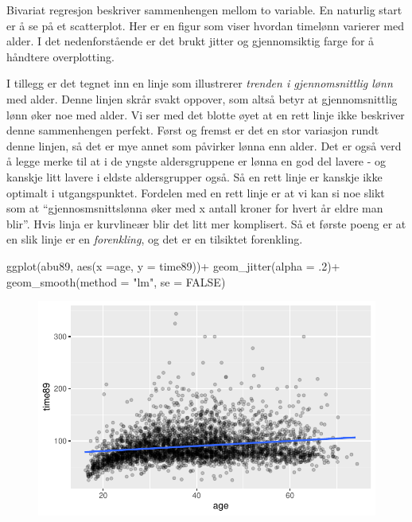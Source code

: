 \documentclass[
  letterpaper,
  DIV=11,
  numbers=noendperiod]{scrreprt}
\newenvironment{Shaded}{\begin{snugshade}}{\end{snugshade}}
\newcommand{\AttributeTok}[1]{\textcolor[rgb]{0.40,0.45,0.13}{#1}}
\newcommand{\ConstantTok}[1]{\textcolor[rgb]{0.56,0.35,0.01}{#1}}
\newcommand{\DecValTok}[1]{\textcolor[rgb]{0.68,0.00,0.00}{#1}}
\newcommand{\FunctionTok}[1]{\textcolor[rgb]{0.28,0.35,0.67}{#1}}
\newcommand{\NormalTok}[1]{\textcolor[rgb]{0.00,0.23,0.31}{#1}}
\newcommand{\SpecialCharTok}[1]{\textcolor[rgb]{0.37,0.37,0.37}{#1}}
\newcommand{\StringTok}[1]{\textcolor[rgb]{0.13,0.47,0.30}{#1}}
\theoremstyle{definition}
\theoremstyle{remark}
\begin{document}
Bivariat regresjon beskriver sammenhengen mellom to variable. En
naturlig start er å se på et scatterplot. Her er en figur som viser
hvordan timelønn varierer med alder. I det nedenforstående er det brukt
jitter og gjennomsiktig farge for å håndtere overplotting.

I tillegg er det tegnet inn en linje som illustrerer \emph{trenden i
gjennomsnittlig lønn} med alder. Denne linjen skrår svakt oppover, som
altså betyr at gjennomsnittlig lønn øker noe med alder. Vi ser med det
blotte øyet at en rett linje ikke beskriver denne sammenhengen perfekt.
Først og fremst er det en stor variasjon rundt denne linjen, så det er
mye annet som påvirker lønna enn alder. Det er også verd å legge merke
til at i de yngste aldersgruppene er lønna en god del lavere - og
kanskje litt lavere i eldste aldersgrupper også. Så en rett linje er
kanskje ikke optimalt i utgangspunktet. Fordelen med en rett linje er at
vi kan si noe slikt som at ``gjennosmsnittslønna øker med x antall
kroner for hvert år eldre man blir''. Hvis linja er kurvlineær blir det
litt mer komplisert. Så et første poeng er at en slik linje er en
\emph{forenkling}, og det er en tilsiktet forenkling.

\begin{Shaded}
\begin{Highlighting}[]
\FunctionTok{ggplot}\NormalTok{(abu89, }\FunctionTok{aes}\NormalTok{(}\AttributeTok{x =}\NormalTok{age, }\AttributeTok{y =}\NormalTok{ time89))}\SpecialCharTok{+}
  \FunctionTok{geom\_jitter}\NormalTok{(}\AttributeTok{alpha =}\NormalTok{ .}\DecValTok{2}\NormalTok{)}\SpecialCharTok{+}
  \FunctionTok{geom\_smooth}\NormalTok{(}\AttributeTok{method =} \StringTok{"lm"}\NormalTok{, }\AttributeTok{se =} \ConstantTok{FALSE}\NormalTok{)}
\end{Highlighting}
\end{Shaded}

\begin{figure}[H]

{\centering \includegraphics{./linearRegresjon_files/figure-pdf/unnamed-chunk-4-1.pdf}

}

\end{figure}
\end{document}

